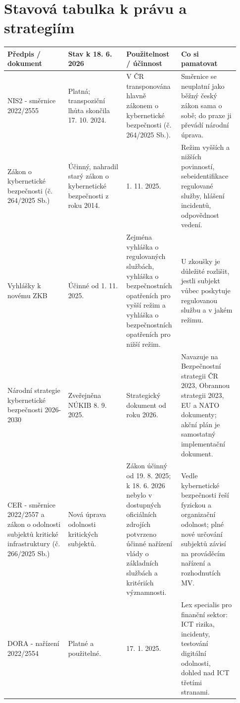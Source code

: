 \documentclass[11pt,a4paper]{article}
\begin{document}
\section*{Stavová tabulka k právu a strategiím}
\begin{longtable}{p{0.25\linewidth}p{0.24\linewidth}p{0.20\linewidth}p{0.24\linewidth}}
\toprule
\textbf{Předpis / dokument} & \textbf{Stav k 18. 6. 2026} & \textbf{Použitelnost / účinnost} & \textbf{Co si pamatovat}\\
\midrule
NIS2 - směrnice 2022/2555 & Platná; transpoziční lhůta skončila 17. 10. 2024. & V ČR transponována hlavně zákonem o kybernetické bezpečnosti (č. 264/2025 Sb.). & Směrnice se neuplatní jako běžný český zákon sama o sobě; do praxe ji převádí národní úprava.\\
\addlinespace
Zákon o kybernetické bezpečnosti (č. 264/2025 Sb.) & Účinný, nahradil starý zákon o kybernetické bezpečnosti z roku 2014. & 1. 11. 2025. & Režim vyšších a nižších povinností, sebeidentifikace regulované služby, hlášení incidentů, odpovědnost vedení.\\
\addlinespace
Vyhlášky k novému ZKB & Účinné od 1. 11. 2025. & Zejména vyhláška o regulovaných službách, vyhláška o bezpečnostních opatřeních pro vyšší režim a vyhláška o bezpečnostních opatřeních pro nižší režim. & U zkoušky je důležité rozlišit, jestli subjekt vůbec poskytuje regulovanou službu a v jakém režimu.\\
\addlinespace
Národní strategie kybernetické bezpečnosti 2026-2030 & Zveřejněna NÚKIB 8. 9. 2025. & Strategický dokument od roku 2026. & Navazuje na Bezpečnostní strategii ČR 2023, Obrannou strategii 2023, EU a NATO dokumenty; akční plán je samostatný implementační dokument.\\
\addlinespace
CER - směrnice 2022/2557 a zákon o odolnosti subjektů kritické infrastruktury (č. 266/2025 Sb.) & Nová úprava odolnosti kritických subjektů. & Zákon účinný od 19. 8. 2025; k 18. 6. 2026 nebylo v dostupných oficiálních zdrojích potvrzeno účinné nařízení vlády o základních službách a kritériích významnosti. & Vedle kybernetické bezpečnosti řeší fyzickou a organizační odolnost; plné nové určování subjektů závisí na prováděcím nařízení a rozhodnutích MV.\\
\addlinespace
DORA - nařízení 2022/2554 & Platné a použitelné. & 17. 1. 2025. & Lex specialis pro finanční sektor: ICT rizika, incidenty, testování digitální odolnosti, dohled nad ICT třetími stranami.\\

\end{longtable}
\end{document}
